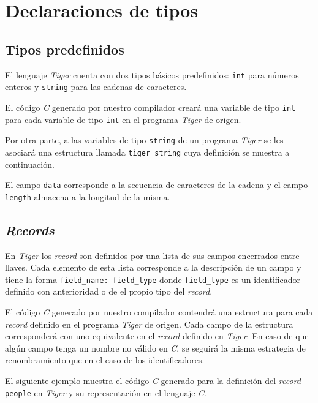 \documentclass{article}
\begin{document}
\section{Declaraciones de tipos}

\subsection{Tipos predefinidos}

El lenguaje \textit{Tiger} cuenta con dos tipos básicos predefinidos:
\texttt{int} para números enteros y \texttt{string} para las cadenas de
caracteres.

El código \textit{C} generado por nuestro compilador creará una variable de
tipo \texttt{int} para cada variable de tipo \texttt{int} en el programa
\textit{Tiger} de origen.

Por otra parte, a las variables de tipo \texttt{string} de un programa
\textit{Tiger} se les asociará una estructura llamada \texttt{tiger\_string}
cuya definición se muestra a continuación.

\begin{quote}

\end{quote}

El campo \texttt{data} corresponde a la secuencia de caracteres de la cadena y
el campo \texttt{length} almacena a la longitud de la misma.

\subsection{\emph{Records}}

En \textit{Tiger} los \textit{record} son definidos por una lista de sus campos
encerrados entre llaves. Cada elemento de esta lista corresponde a la
descripción de un campo y tiene la forma \verb|field_name: field_type| donde
\texttt{field\_type} es un identificador definido con anterioridad o de el
propio tipo del \emph{record}.

El código \textit{C} generado por nuestro compilador contendrá una estructura
para cada \textit{record} definido en el programa \textit{Tiger} de origen.
Cada campo de la estructura corresponderá con uno equivalente en el
\textit{record} definido en \emph{Tiger}. En caso de que algún campo tenga un
nombre no válido en \emph{C}, se seguirá la misma estrategia de renombramiento
que en el caso de los identificadores.

El siguiente ejemplo muestra el código \textit{C} generado para la definición
del \textit{record} \texttt{people} en \emph{Tiger} y su representación en el
lenguaje \emph{C}.
\end{document}
